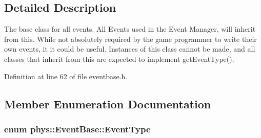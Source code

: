 \subsection{Detailed Description}
The base class for all events. All Events used in the Event Manager, will inherit from this. While not absolutely required by the game programmer to write their own events, it it could be useful. Instances of this class cannot be made, and all classes that inherit from this are expected to implement getEventType(). 

Definition at line 62 of file eventbase.h.



\subsection{Member Enumeration Documentation}
\hypertarget{classphys_1_1EventBase_a5e6a8564e127f654123f0bf6a2751923}{
\subsubsection[{EventType}]{\setlength{\rightskip}{0pt plus 5cm}enum {\bf phys::EventBase::EventType}}}
\label{dd/d80/classphys_1_1EventBase_a5e6a8564e127f654123f0bf6a2751923}

